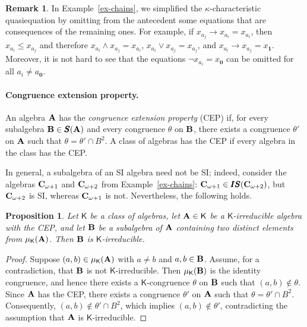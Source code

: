\documentclass[submission,copyright,creativecommons]{eptcs}
\newtheorem{prop}[theorem]{Proposition}
\theoremstyle{definition}
\newtheorem{remark}{Remark}
\newcommand{\alg}[1]{{{\textbf{\upshape #1}}}}
\newcommand{\SU}{\pmb{S}}
\newcommand{\II}{\pmb{I}}
\newcommand{\vv}[1]{\mathsf {#1}}
\newcommand{\Def}[1]{\textit{#1}}
\newcommand{\kk}{\kappa}
\newcommand{\one}{\mathbf{1}}
\newcommand{\zero}{\mathbf{0}}
\begin{document}
\begin{remark}
In Example~\ref{ex-chains}, we simplified the $\kk$-characteristic quasiequation by omitting from the antecedent some equations that are consequences of the remaining ones. For example, if $x_{a_j} \to x_{a_i} = x_{a_i}$, then $x_{a_i} \leq x_{a_j}$ and therefore $x_{a_i} \land x_{a_j} = x_{a_i}$, $x_{a_i} \lor x_{a_j} = x_{a_j}$, and $x_{a_i} \to x_{a_j} = x_{\one}$. Moreover, it is not hard to see that the equations $\neg x_{a_i} = x_{\zero}$ can be omitted for all $a_i \neq a_{\zero}$.
\end{remark}



\paragraph{Congruence extension property.}

An algebra $\alg A$ has the \Def{congruence extension property} (CEP) if, for every subalgebra $\alg B \in \SU(\alg A)$ and every congruence $\theta$ on $\alg B$, there exists a congruence $\theta'$ on $\alg A$ such that $\theta = \theta' \cap B^2$. A class of algebras has the CEP if every algebra in the class has the CEP.

In general, a subalgebra of an SI algebra need not be SI; indeed, consider the algebras $\alg C_{\omega+1}$ and $\alg C_{\omega+2}$ from Example~\ref{ex-chains}: $\alg C_{\omega+1} \in \II\SU(\alg C_{\omega+2})$, but $\alg C_{\omega+2}$ is SI, whereas $\alg C_{\omega+1}$ is not. Nevertheless, the following holds.

\begin{prop}\label{pr-CEPirr}
	Let $\vv K$ be a class of algebras, let $\alg A \in \vv K$ be a $\vv K$-irreducible algebra with the CEP, and let $\alg B$ be a subalgebra of $\alg A$ containing two distinct elements from $\mu_{\vv K}(\alg A)$. Then $\alg B$ is $\vv K$-irreducible.
\end{prop}

\begin{proof}
	Suppose $(a,b) \in \mu_{\vv K}(\alg A)$ with $a \neq b$ and $a,b \in \alg B$. Assume, for a contradiction, that $\alg B$ is not $\vv K$-irreducible. Then $\mu_{\vv K}(\alg B)$ is the identity congruence, and hence there exists a $\vv K$-congruence $\theta$ on $\alg B$ such that $(a,b) \notin \theta$. Since $\alg A$ has the CEP, there exists a congruence $\theta'$ on $\alg A$ such that $\theta = \theta' \cap B^2$. Consequently, $(a,b) \notin \theta' \cap B^2$, which implies $(a,b) \notin \theta'$, contradicting the assumption that $\alg A$ is $\vv K$-irreducible.
\end{proof}
\end{document}
